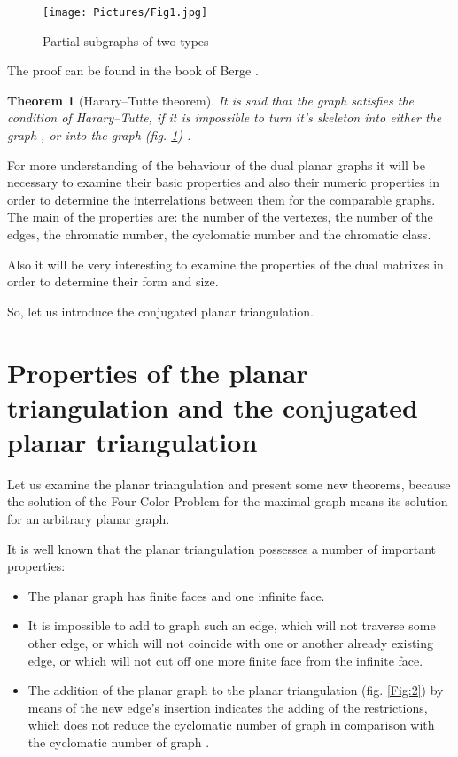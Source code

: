 \documentclass{amsart}
\newtheorem{theorem}{Theorem}
\theoremstyle{plain}
\numberwithin{equation}{section}
\begin{document}
\begin{figure}[htb]
		\texttt{[image: Pictures/Fig1.jpg]}
	\caption{Partial subgraphs of two types}
	\label{Fig:1}
\end{figure}

The proof can be found in the book of Berge \cite {Berge}.

\begin {theorem}[Harary--Tutte theorem]
It is said that the graph  satisfies the condition of Harary--Tutte, if it is impossible to turn it's skeleton into either the graph , or into the graph  (fig. \ref{Fig:1}) \cite {Harary}.
\end {theorem}

For more understanding of the behaviour of the dual planar graphs it will be necessary to examine their basic properties and also their numeric properties in order to determine the interrelations between them for the comparable graphs. The main of the properties are: the number of the vertexes, the number of the edges, the chromatic number, the cyclomatic number and the chromatic class. 

Also it will be very interesting to examine the properties of the dual matrixes in order to determine their form and size.

So, let us introduce the conjugated planar triangulation. 

\section{Properties of the planar triangulation and the conjugated planar triangulation}

Let us examine the planar triangulation and present some new theorems, because the solution of the Four Color Problem for the maximal graph  means its solution for an arbitrary planar graph. 

It is well known that the planar triangulation possesses a number of important properties:

\begin{itemize}
\item 
The planar graph  has  finite faces and one infinite face.
\item 
It is impossible to add to graph  such an edge, which will not traverse some other edge, or which will not coincide with one or another already existing edge, or which will not cut off one more finite face from the infinite face.
\item 
The addition of the planar graph  to the planar triangulation  (fig. \ref{Fig:2}) by means of the new edge's insertion indicates the adding of the restrictions, which does not reduce the cyclomatic number of graph  in comparison with the cyclomatic number of graph .
\end{itemize}
\end{document}
